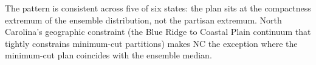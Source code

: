 The pattern is consistent across five of six states: the \ar{} plan sits at the compactness extremum of the ensemble distribution, not the partisan extremum. North Carolina's geographic constraint (the Blue Ridge to Coastal Plain continuum that tightly constrains minimum-cut partitions) makes NC the exception where the minimum-cut plan coincides with the ensemble median.

